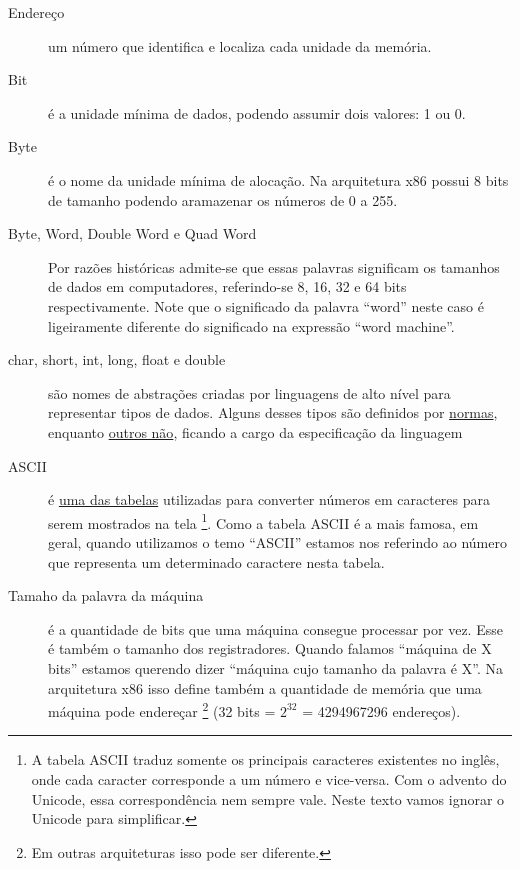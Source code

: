 \begin{description}

\item[Endereço] um número que identifica e localiza cada unidade da memória.

\item[Bit] é a unidade mínima de dados, podendo assumir dois valores: 1 ou 0.

\item[Byte] é o nome da unidade mínima de alocação. Na arquitetura x86 possui 8 bits de tamanho podendo aramazenar os números de 0 a 255.

\item[Byte, Word, Double Word e Quad Word] Por razões históricas admite-se que essas palavras significam os tamanhos de dados em computadores, referindo-se 8, 16, 32 e 64 bits respectivamente. Note que o significado da palavra ``word'' neste caso é ligeiramente diferente do significado na expressão ``word machine''.

\item[char, short, int, long, float e double] são nomes de abstrações criadas por linguagens de alto nível para representar tipos de dados. Alguns desses tipos são definidos por \href{http://en.wikipedia.org/wiki/IEEE_754-2008}{normas}, enquanto \href{http://en.wikipedia.org/wiki/Integer_(computer_science)}{outros não}, ficando a cargo da especificação da linguagem

\item[ASCII] é \href{http://en.wikipedia.org/wiki/Character_encoding}{uma das tabelas} utilizadas para converter números em caracteres para serem mostrados na tela \footnote{A tabela ASCII traduz somente os principais caracteres existentes no inglês, onde cada caracter corresponde a um número e vice-versa. Com o advento do Unicode, essa correspondência nem sempre vale. Neste texto vamos ignorar o Unicode para simplificar.}. Como a tabela ASCII é a mais famosa, em geral, quando utilizamos o temo ``ASCII'' estamos nos referindo ao número que representa um determinado caractere nesta tabela.

\item[Tamaho da palavra da máquina] é a quantidade de bits que uma máquina consegue processar por vez. Esse é também o tamanho dos registradores. Quando falamos ``máquina de X bits'' estamos querendo dizer ``máquina cujo tamanho da palavra é X''. Na arquitetura x86 isso define também a quantidade de memória que uma máquina pode endereçar \footnote{Em outras arquiteturas isso pode ser diferente.} (32 bits = $2^{32}$ = 4294967296 endereços).


\end{description}
